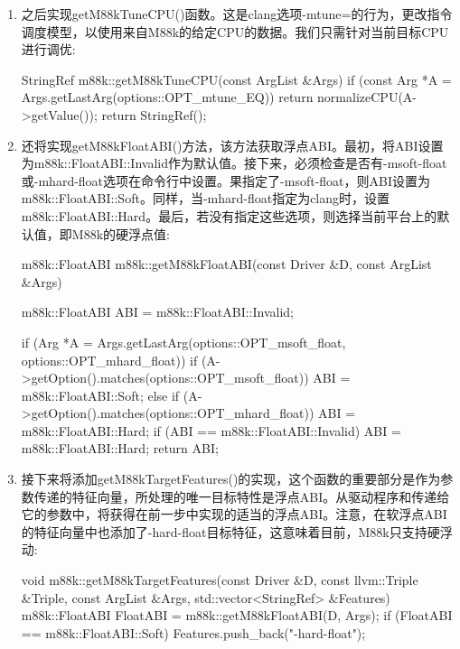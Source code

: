 \begin{enumerate}
\item
之后实现getM88kTuneCPU()函数。这是clang选项-mtune=的行为，更改指令调度模型，以使用来自M88k的给定CPU的数据。我们只需针对当前目标CPU进行调优:

\begin{cpp}
StringRef m88k::getM88kTuneCPU(const ArgList &Args) {
    if (const Arg *A = Args.getLastArg(options::OPT_mtune_EQ))
        return normalizeCPU(A->getValue());
    return StringRef();
}
\end{cpp}

\item
还将实现getM88kFloatABI()方法，该方法获取浮点ABI。最初，将ABI设置为m88k::FloatABI::Invalid作为默认值。接下来，必须检查是否有-msoft-float或-mhard-float选项在命令行中设置。果指定了-msoft-float，则ABI设置为m88k::FloatABI::Soft。同样，当-mhard-float指定为clang时，设置m88k::FloatABI::Hard。最后，若没有指定这些选项，则选择当前平台上的默认值，即M88k的硬浮点值:

\begin{cpp}
m88k::FloatABI m88k::getM88kFloatABI(const Driver &D, const
ArgList &Args) {
    m88k::FloatABI ABI = m88k::FloatABI::Invalid;

    if (Arg *A =
        Args.getLastArg(options::OPT_msoft_float,
    options::OPT_mhard_float)) {
        if (A->getOption().matches(options::OPT_msoft_float))
            ABI = m88k::FloatABI::Soft;
        else if (A->getOption().matches(options::OPT_mhard_float))
            ABI = m88k::FloatABI::Hard;
    }
    if (ABI == m88k::FloatABI::Invalid)
        ABI = m88k::FloatABI::Hard;
    return ABI;
}
\end{cpp}

\item
接下来将添加getM88kTargetFeatures()的实现，这个函数的重要部分是作为参数传递的特征向量，所处理的唯一目标特性是浮点ABI。从驱动程序和传递给它的参数中，将获得在前一步中实现的适当的浮点ABI。注意，在软浮点ABI的特征向量中也添加了-hard-float目标特征，这意味着目前，M88k只支持硬浮动:

\begin{cpp}
void m88k::getM88kTargetFeatures(const Driver &D,
                                 const llvm::Triple &Triple,
                                 const ArgList &Args,
                                 std::vector<StringRef> &Features) {
    m88k::FloatABI FloatABI = m88k::getM88kFloatABI(D, Args);
    if (FloatABI == m88k::FloatABI::Soft)
        Features.push_back("-hard-float");
}
\end{cpp}

\end{enumerate}

